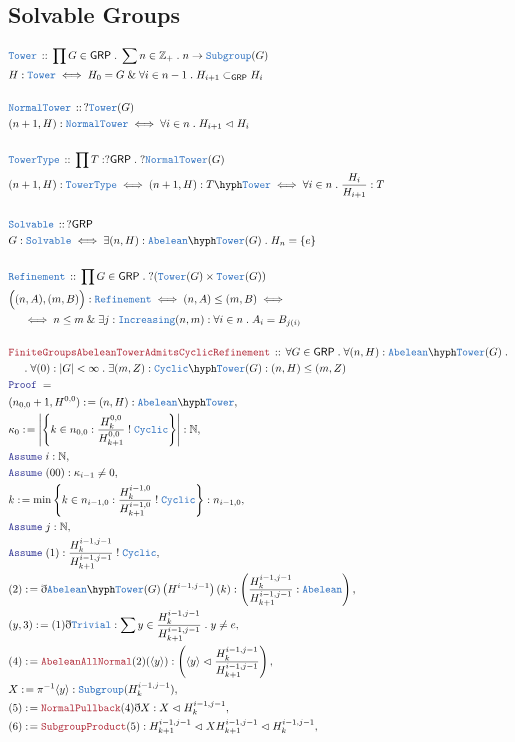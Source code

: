 \documentclass[12pt]{scrartcl}
\newcommand{\TYPE}[1]{\textcolor{NavyBlue}{\mathtt{#1}}}
\newcommand{\LOGIC}[1]{\textcolor{Blue}{\mathtt{#1}}}
\newcommand{\THM}[1]{\textcolor{Maroon}{\mathtt{#1}}}
\renewcommand{\.}{\; . \;}
\newcommand{\de}{: \kern 0.1pc =}
\newcommand{\IsNot}{\; ! \;}
\newcommand{\Theorem}[2]{& \THM{#1} \, :: \, #2 \\ & \Proof = \\ }
\newcommand{\DeclareType}[2]{& \TYPE{#1} \, :: \, #2 \\}
\newcommand{\DefineType}[3]{& #1 : \TYPE{#2} \iff #3 \\}
\newcommand{\DefineNamedType}[4]{& #1 : \TYPE{#2} \iff #3 \iff #4 \\}
\newcommand{\NewLine}{\\ & \kern 1pc}
\newcommand{\Page}[1]{ \begin{align*} #1 \end{align*}   }
\newcommand{ \bd }{ \ByDef }
\renewcommand{\And}{\; \& \;}
\newcommand{\Int}{\mathbb{Z} }
\newcommand{\Nat}{\mathbb{N} }
\newcommand{\Say}[3]{& #1 \de #2 : #3, \\}
\newcommand{\Assume}[2]{& \LOGIC{Assume} \; #1 : #2, \\}
\newcommand{\ByDef}{\eth}
\newcommand{\Proof}{\LOGIC{Proof} \; }
\newcommand{\Abel}{\TYPE{Abelean}}
\newcommand{\Sgrp}{\subset_{\mathsf{GRP}}}
\newcommand{\Nrml}{\vartriangleleft}
\newcommand{\GRP}{\mathsf{GRP}}
\begin{document}
\subsection{Solvable Groups}
\Page{
	\DeclareType{Tower}{ \prod G \in \GRP \. \sum n \in \Int_+ \. n \to \TYPE{Subgroup}(G)}
	\DefineType{H}{Tower}{ H_0 = G \And \forall i \in n - 1 \. H_{i+1} \Sgrp H_i  }
	\\
	\DeclareType{NormalTower}{?\TYPE{Tower}(G)}
	\DefineType{(n+1,H)}{NormalTower}{ \forall i \in n \. H_{i+1} \Nrml H_i  }
	\\
	\DeclareType{TowerType}{ \prod T : ?\GRP \. ?\TYPE{NormalTower}(G)}
	\DefineNamedType{(n+1,H)}{TowerType}{(n+1,H):T\hyph\TYPE{Tower}}{  \forall i \in n \. \frac{H_{i}}{H_{i+1}} : T }
	\\
	\DeclareType{Solvable}{?\GRP}
	\DefineType{G}{Solvable}{\exists (n,H) : \Abel\hyph\TYPE{Tower}(G) \. H_n = \{ e \} }
	\\
	\DeclareType{Refinement}{\prod G \in \GRP \. ?(\TYPE{Tower}(G) \times \TYPE{Tower}(G))}
	\DefineNamedType{\Big((n,A),(m,B)\Big)}{Refinement}{ (n,A) \le (m,B)  }{ 
	\NewLine \iff n \le m \And \exists j : \TYPE{Increasing}(n,m) :
		\forall i \in n \. A_i = B_{j(i)} }
	\\
	\Theorem{FiniteGroupsAbeleanTowerAdmitsCyclicRefinement}{\forall G \in \GRP \. \forall (n,H) : \Abel\hyph\TYPE{Tower}(G) \. 
	 \NewLine \.
	 \forall (0) : |G| < \infty \. \exists (m,Z) : \TYPE{Cyclic}\hyph\TYPE{Tower}(G) : (n,H) \le (m,Z)
	}
	\Say{(n_{0,0} + 1,H^{0,0})}{(n,H)}{\Abel\hyph\TYPE{Tower}}
	\Say{\kappa_{0}}{\left|\left\{ k \in  n_{0,0} : \frac{H^{0,0}_{k}}{H^{0,0}_{k+1}} \IsNot \TYPE{Cyclic}\right\} 
		\right|
	}{\Nat}
	\Assume{i}{\Nat}
	\Assume{(00)}{\kappa_{i-1} \neq 0}
	\Say{k}{ \min\left\{ k \in  n_{i-1,0} : \frac{H^{i-1,0}_{k}}{H^{i-1,0}_{k+1}} \IsNot \TYPE{Cyclic}\right\} }{n_{i-1,0}}
	\Assume{j}{\Nat}
	\Assume{(1)}{\frac{H^{i-1,j-1}_{k}}{H^{i-1,j-1}_{k+1}} \IsNot \TYPE{Cyclic}}
	\Say{(2)}{\bd \Abel \hyph \TYPE{Tower}(G)\left( H^{i-1,j-1} \right)(k)}
	{  \left( \frac{H^{i-1,j-1}_{k}}{H^{i-1,j-1}_{k+1}} : \Abel  \right)  }
	\Say{(y,3)}{ (1)\bd \TYPE{Trivial}}{ \sum y \in \frac{H^{i-1,j-1}_{k}}{H^{i-1,j-1}_{k+1}} \. y \neq e }
	\Say{(4)}{\THM{AbeleanAllNormal}(2)(\langle y \rangle)}{\left( \langle y \rangle \Nrml  
		\frac{H^{i-1,j-1}_{k}}{H^{i-1,j-1}_{k+1}}\right)}
	\Say{X}{ \pi^{-1}\langle y \rangle  }{\TYPE{Subgroup}(H^{i-1,j-1}_k)}
	\Say{(5)}{\THM{NormalPullback}(4)\bd X}{X \Nrml H^{i-1,j-1}_k}
	\Say{(6)}{\THM{SubgroupProduct}(5)}{ H^{i-1,j-1}_{k+1} \Nrml XH^{i-1,j-1}_{k+1} \Nrml H^{i-1,j-1}_k       }
}
\end{document}
